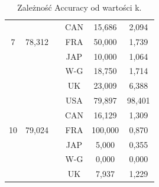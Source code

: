 \documentclass{classrep}
\begin{document}
\begin{table}[h!]
\begin{tabular} {c c c c c c}
		&			&\vline& CAN & 15,686 & 2,094 \\
		7 & 78,312 	&\vline& FRA & 50,000 & 1,739 \\
		&			&\vline& JAP & 10,000 & 1,064 \\
		&			&\vline& W-G & 18,750 & 1,714 \\
		&			&\vline& UK  & 23,009 & 6,388 \\
		\hline 
		&   		&\vline& USA & 79,897 & 98,401 \\
		&			&\vline& CAN & 16,129 & 1,309 \\
		10 & 79,024 &\vline& FRA & 100,000 & 0,870 \\
		&			&\vline& JAP & 5,000 & 0,355 \\
		&			&\vline& W-G & 0,000 & 0,000 \\
		&			&\vline& UK  & 7,937 & 1,229 \\

		\hline
	\end{tabular}
	\caption{Zależność Accuracy od wartości k. }
	\label{tabelaK}
\end{table}
\end{document}
